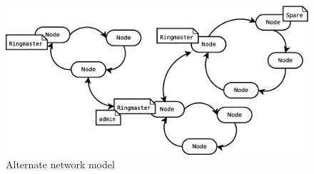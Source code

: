 \documentclass[10pt,a4paper]{article}
\begin{document}
\begin{figure}[h]
\centering
\includegraphics[scale=0.3]{fig/old_topology.eps}
 \caption{Alternate network model}
 \label{fig:old_network_model}
\end{figure}



\nocite{DistSystems}
\end{document}
